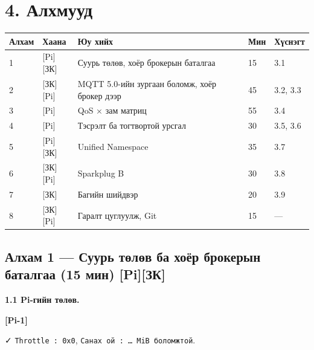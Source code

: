 \hypertarget{ux430ux43bux445ux43cux443ux443ux434}{%
\section{4. Алхмууд}\label{ux430ux43bux445ux43cux443ux443ux434}}

\begingroup\scriptsize\begin{longtable}[]{@{}lllll@{}}
\toprule
Алхам & Хаана & Юу хийх & Мин & Хүснэгт\tabularnewline
\midrule
\endhead
1 & {[}Pi{]}{[}ЗК{]} & Суурь төлөв, хоёр брокерын баталгаа & 15 & 3.1\tabularnewline
2 & {[}ЗК{]}{[}Pi{]} & MQTT 5.0-ийн зургаан боломж, хоёр брокер дээр & 45 & 3.2, 3.3\tabularnewline
3 & {[}Pi{]} & QoS × зам матриц & 55 & 3.4\tabularnewline
4 & {[}Pi{]} & Тэсрэлт ба тогтвортой урсгал & 30 & 3.5, 3.6\tabularnewline
5 & {[}Pi{]}{[}ЗК{]} & Unified Namespace & 35 & 3.7\tabularnewline
6 & {[}ЗК{]}{[}Pi{]} & Sparkplug B & 30 & 3.8\tabularnewline
7 & {[}ЗК{]} & Багийн шийдвэр & 20 & 3.9\tabularnewline
8 & {[}ЗК{]}{[}Pi{]} & Гаралт цуглуулж, Git & 15 & ---\tabularnewline
\bottomrule
\end{longtable}\endgroup

\hypertarget{ux430ux43bux445ux430ux43c-1-ux441ux443ux443ux440ux44c-ux442ux4e9ux43bux4e9ux432-ux431ux430-ux445ux43eux451ux440-ux431ux440ux43eux43aux435ux440ux44bux43d-ux431ux430ux442ux430ux43bux433ux430ux430-15-ux43cux438ux43d-piux437ux43a}{%
\subsection{Алхам 1 --- Суурь төлөв ба хоёр брокерын баталгаа (15 мин) {[}Pi{]}{[}ЗК{]}}\label{ux430ux43bux445ux430ux43c-1-ux441ux443ux443ux440ux44c-ux442ux4e9ux43bux4e9ux432-ux431ux430-ux445ux43eux451ux440-ux431ux440ux43eux43aux435ux440ux44bux43d-ux431ux430ux442ux430ux43bux433ux430ux430-15-ux43cux438ux43d-piux437ux43a}}

\textbf{1.1 Pi-гийн төлөв.}

\textbf{{[}Pi-1{]}}

\begin{Shaded}
\begin{Highlighting}[]
\KeywordTok{|} 
\end{Highlighting}
\end{Shaded}

✓ \texttt{Throttle\ :\ 0x0}, \texttt{Санах\ ой\ :\allowbreak{}\ \ldots{}\ MiB\ боломжтой}.

